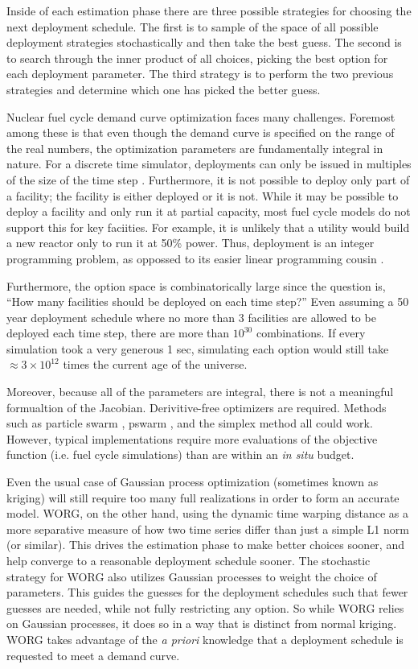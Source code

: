 Inside of each estimation phase there are three possible strategies for 
choosing the next deployment schedule.  The first is to sample of the 
space of all possible deployment strategies stochastically and then take the 
best guess.  The second is to search through the inner product of all choices,
picking the best option for each deployment parameter. The third strategy
is to perform the two previous strategies and determine which one has picked
the better guess.

Nuclear fuel cycle demand curve optimization faces many challenges. 
Foremost among these is that even though the demand curve is specified on 
the range of the real numbers, the optimization parameters are fundamentally 
integral in nature. For a discrete time simulator, deployments can only 
be issued in multiples of the size of the time step 
\cite{kelton2000simulation}. Furthermore, 
it is not possible to deploy only part of a facility; the facility is either 
deployed or it is not. While it may be possible to deploy a facility and 
only run it at partial capacity, most fuel cycle models do not support this
for key faciities.  For example, it is unlikely that a utility would build 
a new reactor only to run it at 50\% power. Thus, deployment is an integer 
programming problem, as oppossed to its easier linear programming cousin
\citeme.

Furthermore, the option space is combinatorically large since the 
question is, ``How many facilities should be deployed on each time step?'' 
Even assuming a 50 year deployment schedule where no more than 3 facilities 
are allowed to be deployed each time step, there are more than $10^30$ 
combinations. If every simulation took a very generous 1 sec, simulating 
each option would still take $\approx 3\times10^12$ times the current age
of the universe.

Moreover, because all of the parameters are integral, there is not a 
meaningful formualtion of the Jacobian. Derivitive-free optimizers are 
required. Methods such as particle swarm \citeme, pswarm \citeme, and the 
simplex method all could work.  However, typical implementations require
more evaluations of the objective function (i.e. fuel cycle simulations)
than are within an \emph{in situ} budget. 

Even the usual case of 
Gaussian process optimization (sometimes known as kriging) will still 
require too many full realizations in order to form an accurate model.
WORG, on the other hand, using the dynamic time warping distance as a 
more separative measure of how two time series differ than just a simple
L1 norm (or similar). This drives the estimation phase to make better choices
sooner, and help converge to a reasonable deployment schedule sooner. 
The stochastic strategy for WORG also utilizes Gaussian processes to 
weight the choice of parameters.  This guides the guesses for the deployment
schedules such that fewer guesses are needed, while not fully restricting 
any option.  So while WORG relies on Gaussian processes, it does so in a way
that is distinct from normal kriging. WORG
takes advantage of the \emph{a priori} knowledge that a deployment 
schedule is requested to meet a demand curve. 

